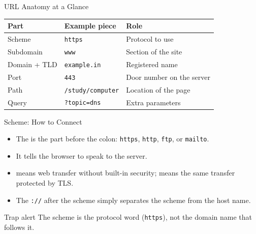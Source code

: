 \documentclass[aspectratio=169]{beamer}
\begin{document}
\begin{frame}{URL Anatomy at a Glance}
  \begin{center}
    \begin{tabular}{p{}p{}p{}}
      \toprule
      \textbf{Part} & \textbf{Example piece} & \textbf{Role} \\
      \midrule
      Scheme & \texttt{https} & Protocol to use \\
      Subdomain & \texttt{www} & Section of the site \\
      Domain + TLD & \texttt{example.in} & Registered name \\
      Port & \texttt{443} & Door number on the server \\
      Path & \texttt{/study/computer} & Location of the page \\
      Query & \texttt{?topic=dns} & Extra parameters \\
      \bottomrule
    \end{tabular}
  \end{center}
  \vspace{0.25cm}
\end{frame}

\begin{frame}{Scheme: How to Connect}
  \begin{itemize}
    \item The  is the part before the colon: \texttt{https},
      \texttt{http}, \texttt{ftp}, or \texttt{mailto}.
    \item It tells the browser  to speak to the server.
    \item {} means web transfer without built-in security;
       means the same transfer protected by TLS.
    \item The \texttt{://} after the scheme simply separates the scheme from
      the host name.
  \end{itemize}
  \begin{alertblock}{Trap alert}
    The scheme is the protocol word (\texttt{https}), not the domain name
    that follows it.
  \end{alertblock}
\end{frame}
\end{document}

